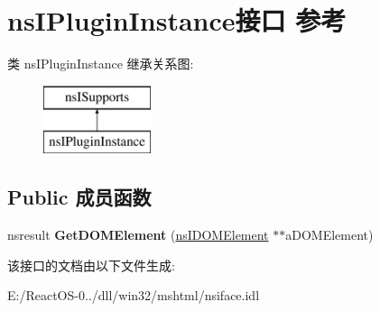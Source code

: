 \hypertarget{interfacens_i_plugin_instance}{}\section{ns\+I\+Plugin\+Instance接口 参考}
\label{interfacens_i_plugin_instance}
类 ns\+I\+Plugin\+Instance 继承关系图\+:\begin{figure}[H]
\begin{center}
\leavevmode
\includegraphics[height=2.000000cm]{interfacens_i_plugin_instance}
\end{center}
\end{figure}
\subsection*{Public 成员函数}
\begin{DoxyCompactItemize}
\item 
\mbox{\label{interfacens_i_plugin_instance_a42e30dac488fccff9854face3e0e688e}} 
nsresult {\bfseries Get\+D\+O\+M\+Element} (\hyperlink{interfacens_i_d_o_m_element}{ns\+I\+D\+O\+M\+Element} $\ast$$\ast$a\+D\+O\+M\+Element)
\end{DoxyCompactItemize}


该接口的文档由以下文件生成\+:\begin{DoxyCompactItemize}
\item 
E\+:/\+React\+O\+S-\/0../dll/win32/mshtml/nsiface.\+idl\end{DoxyCompactItemize}

